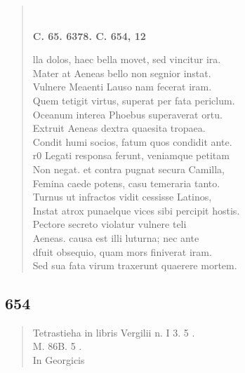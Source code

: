 \documentclass[11pt, a4paper]{report}
\begin{document}
\begin{verse}
        ﻿\pagebreak 
    \begin{center} \textbf{C. 65. 6378. C. 654, 12} \end{center} \marginpar{[125]} lla dolos, haec bella movet, sed vincitur ira. \\ Mater at Aeneas bello non segnior instat. \\ Vulnere Meaenti Lauso nam fecerat iram. \\ Quem tetigit virtus, superat per fata periclum. \\ Oceanum interea \rbrack  Phoebus superaverat ortu. \\ Extruit Aeneas dextra quaesita tropaea. \\ Condit humi socios, fatum quos condidit ante. \\ r0 Legati responsa ferunt, veniamque petitam \\ Non negat. et contra pugnat secura Camilla, \\ Femina caede potens, casu temeraria tanto. \\ Turnus ut infractos \rbrack  vidit cessisse Latinos, \\ Instat atrox punaelque vices sibi percipit hostis. \\ Pectore secreto violatur vulnere teli \\ Aeneas. causa est illi luturna; nec ante \\ dfuit obsequio, quam mors finiverat iram. \\ Sed sua fata virum traxerunt quaerere mortem. \\ 
      \end{verse}
  
            \subsection*{654}
      \begin{verse}
      Tetrastieha in libris Vergilii n. I 3. 5 . \\ M. 86B. 5 . \\ In Georgicis \\ 
      \end{verse}
  
\end{document}
